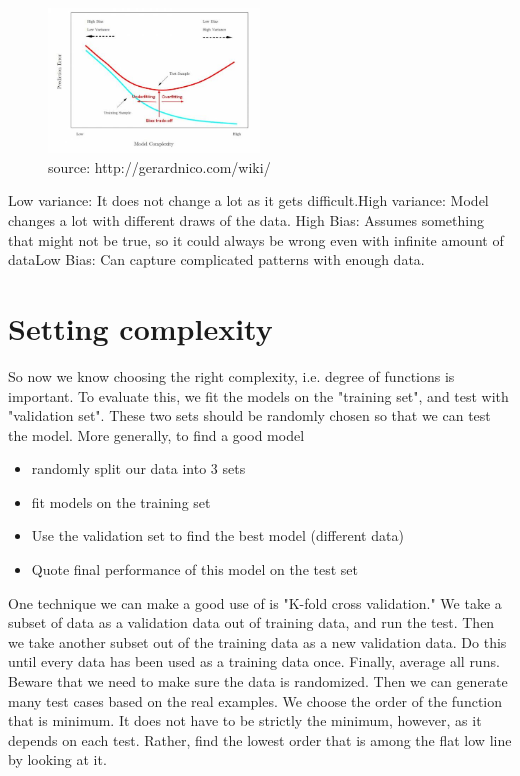 \begin{figure}[ht]
  \begin{center}
    \includegraphics[width=0.5\textwidth]{figures/figure2.jpg}
    \caption{
      source: http://gerardnico.com/wiki/ }
    \label{fig:example_figure}
  \end{center}
\end{figure}
Low variance: It does not change a lot as it gets difficult.\newline High variance: Model changes a lot with different draws of the data. \newline
High Bias: Assumes something that might not be true, so it could always be wrong even with infinite amount of data\newline Low Bias: Can capture complicated patterns with enough data.

\section{Setting complexity}

So now we know choosing the right complexity, i.e. degree of functions is important. To evaluate this, we fit the models on the "training set", and test with "validation set". These two sets should be randomly chosen so that we can test the model.
\newline More generally, to find a good model 
\begin{itemize}
\item randomly split our data into 3 sets
\item fit models on the training set
\item Use the validation set to find the best model (different data)
\item Quote final performance of this model on the test set
\end{itemize}

One technique we can make a good use of is "K-fold cross validation." We take a subset of data as a validation data out of training data, and run the test. Then we take another subset out of the training data as a new validation data. Do this until every data has been used as a training data once. Finally, average all runs. Beware that we need to make sure the data is randomized. Then we can generate many test cases based on the real examples. We choose the order of the function that is minimum. It does not have to be strictly the minimum, however,  as it depends on each test. Rather, find the lowest order that is among the flat low line by looking at it.

